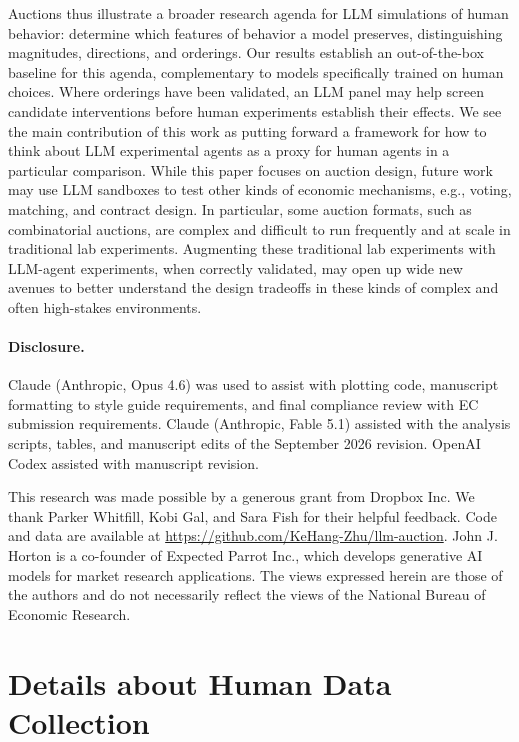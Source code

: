 \documentclass[acmsmall,screen,review]{acmart}
\begin{document}
Auctions thus illustrate a broader research agenda for LLM simulations of human behavior: determine which features of behavior a model preserves, distinguishing magnitudes, directions, and orderings. Our results establish an out-of-the-box baseline for this agenda, complementary to models specifically trained on human choices. Where orderings have been validated, an LLM panel may help screen candidate interventions before human experiments establish their effects. We see the main contribution of this work as putting forward a framework for how to think about LLM experimental agents as a proxy for human agents in a particular comparison. While this paper focuses on auction design, future work may use LLM sandboxes to test other kinds of economic mechanisms, e.g., voting, matching, and contract design. In particular, some auction formats, such as combinatorial auctions, are complex and difficult to run frequently and at scale in traditional lab experiments. Augmenting these traditional lab experiments with LLM-agent experiments, when correctly validated, may open up wide new avenues to better understand the design tradeoffs in these kinds of complex and often high-stakes environments.

\paragraph{Disclosure.} Claude (Anthropic, Opus 4.6) was used to assist with plotting code, manuscript formatting to style guide requirements, and final compliance review with EC submission requirements. Claude (Anthropic, Fable 5.1) assisted with the analysis scripts, tables, and manuscript edits of the September 2026 revision. OpenAI Codex assisted with manuscript revision.


\begin{acks}
This research was made possible by a generous grant from Dropbox Inc. We thank Parker Whitfill, Kobi Gal, and Sara Fish for their helpful feedback. Code and data are available at \url{https://github.com/KeHang-Zhu/llm-auction}. John J. Horton is a co-founder of Expected Parrot Inc., which develops generative AI models for market research applications. The views expressed herein are those of the authors and do not necessarily reflect the views of the National Bureau of Economic Research.

\end{acks}



\newpage
\appendix
\section{Details about Human Data Collection}\label{app:human}
\end{document}

